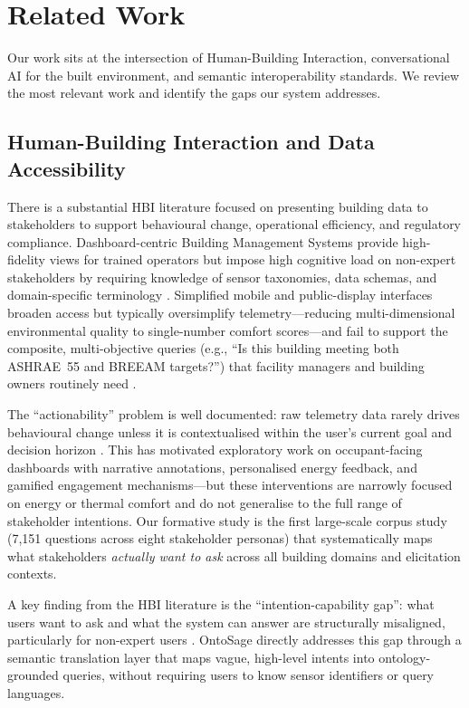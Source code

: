 \documentclass[acmsmall]{acmart}
\begin{document}
\section{Related Work}
\label{sec:related-work}

Our work sits at the intersection of Human-Building Interaction, conversational AI for the built environment, and semantic interoperability standards. We review the most relevant work and identify the gaps our system addresses.

\subsection{Human-Building Interaction and Data Accessibility}

There is a substantial HBI literature focused on presenting building data to stakeholders to support behavioural change, operational efficiency, and regulatory compliance. Dashboard-centric Building Management Systems provide high-fidelity views for trained operators but impose high cognitive load on non-expert stakeholders by requiring knowledge of sensor taxonomies, data schemas, and domain-specific terminology \cite{Häikiö2020}. Simplified mobile and public-display interfaces broaden access but typically oversimplify telemetry---reducing multi-dimensional environmental quality to single-number comfort scores---and fail to support the composite, multi-objective queries (e.g., ``Is this building meeting both ASHRAE~55 and BREEAM targets?'') that facility managers and building owners routinely need \cite{ma2023}.

The ``actionability'' problem is well documented: raw telemetry data rarely drives behavioural change unless it is contextualised within the user's current goal and decision horizon \cite{Nabavi2023}. This has motivated exploratory work on occupant-facing dashboards with narrative annotations, personalised energy feedback, and gamified engagement mechanisms---but these interventions are narrowly focused on energy or thermal comfort and do not generalise to the full range of stakeholder intentions. Our formative study is the first large-scale corpus study (7{,}151 questions across eight stakeholder personas) that systematically maps what stakeholders \emph{actually want to ask} across all building domains and elicitation contexts.

A key finding from the HBI literature is the ``intention-capability gap'': what users want to ask and what the system can answer are structurally misaligned, particularly for non-expert users \cite{galanos2023}. OntoSage directly addresses this gap through a semantic translation layer that maps vague, high-level intents into ontology-grounded queries, without requiring users to know sensor identifiers or query languages.
\end{document}

